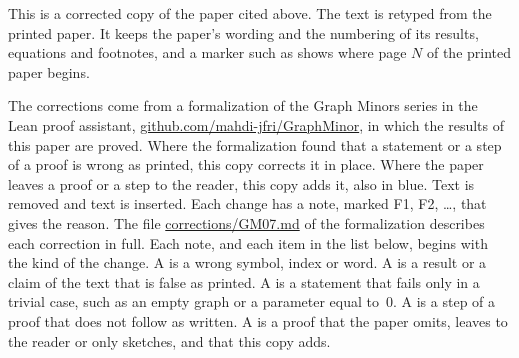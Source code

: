 
This is a corrected copy of the paper cited above. The text is retyped from the printed paper.
It keeps the paper's wording and the numbering of its results, equations and footnotes, and a
marker such as  shows where page $N$ of the printed paper begins.

The corrections come from a formalization of the Graph Minors series in the Lean proof
assistant, \href{https://github.com/mahdi-jfri/GraphMinor}{github.com/mahdi-jfri/GraphMinor},
in which the results of this paper are proved. Where the formalization found that a statement
or a step of a proof is wrong as printed, this copy corrects it in place. Where the paper leaves a proof or a step to the reader, this copy adds it, also in blue. Text  is removed and text  is inserted. Each change has a note, marked
\textcolor{fixcolor}{\sffamily F1}, \textcolor{fixcolor}{\sffamily F2}, \dots, that gives the
reason. The file
\href{https://github.com/mahdi-jfri/GraphMinor/blob/main/corrections/GM07.md}{corrections/GM07.md}
of the formalization describes each correction in full. Each note, and each item in the list below, begins with the kind of the change. A  is a wrong symbol, index or word. A  is a result or a claim of the text that is false as printed. A  is a statement that fails only in a trivial case, such as an empty graph or a parameter equal to~$0$. A  is a step of a proof that does not follow as written. A  is a proof that the paper omits, leaves to the reader or only sketches, and that this copy adds.

